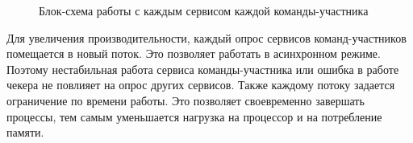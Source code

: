 \begin{figure}[h!]
\caption{Блок-схема работы с каждым сервисом каждой команды-участника}
\end{figure}
\clearpage

Для увеличения производительности, каждый опрос сервисов команд-участников помещается в новый поток. Это позволяет работать в асинхронном режиме. Поэтому нестабильная работа сервиса команды-участника или ошибка в работе чекера не повлияет на опрос других сервисов. Также каждому потоку задается ограничение по времени работы. Это позволяет своевременно завершать процессы, тем самым уменьшается нагрузка на процессор и на потребление памяти.

